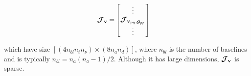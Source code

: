 \begin{alignat}{2}
\label{eq:J}
\bm{\mathcal{J}}_{\textbf{v}}=&
\begin{bmatrix} 
\vdots \\ 
\bm{\mathcal{J}}_{{\textbf{v}_{pq}},\bm{g_{\!_{W}}}}\\ 
\vdots \\ 
\end{bmatrix}
\end{alignat}

\noindent which have size $[(4n_{bl} n_t n_{\nu})\times (8n_a n_d)]$,
where $n_{bl}$ is the number of baselines and is typically
$n_{bl}=n_a(n_a-1)/2$. Although it has large dimensions, $\bm{\mathcal{J}}_{\textbf{v}}$ is
sparse.




